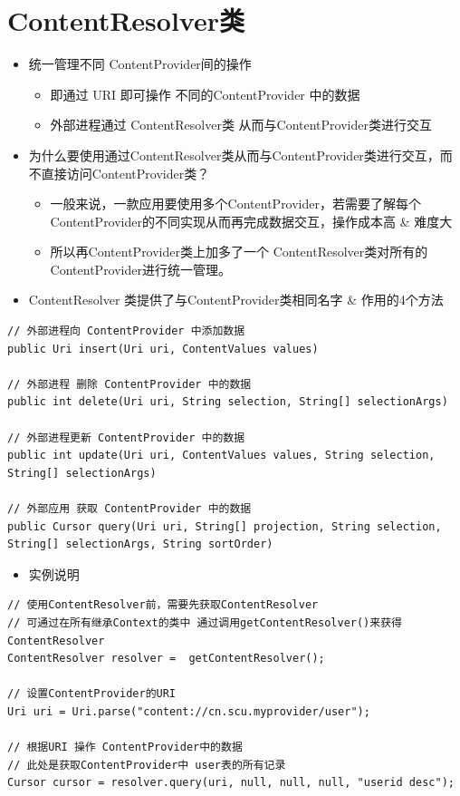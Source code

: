 \documentclass[9pt, b5paaper]{book}
\begin{document}
\section{ContentResolver类}
\label{sec-5-4}
\begin{itemize}
\item 统一管理不同 ContentProvider间的操作
\begin{itemize}
\item 即通过 URI 即可操作 不同的ContentProvider 中的数据
\item 外部进程通过 ContentResolver类 从而与ContentProvider类进行交互
\end{itemize}
\item 为什么要使用通过ContentResolver类从而与ContentProvider类进行交互，而不直接访问ContentProvider类？
\begin{itemize}
\item 一般来说，一款应用要使用多个ContentProvider，若需要了解每个ContentProvider的不同实现从而再完成数据交互，操作成本高 \& 难度大
\item 所以再ContentProvider类上加多了一个 ContentResolver类对所有的ContentProvider进行统一管理。
\end{itemize}
\item ContentResolver 类提供了与ContentProvider类相同名字 \& 作用的4个方法
\end{itemize}
\begin{verbatim}
// 外部进程向 ContentProvider 中添加数据
public Uri insert(Uri uri, ContentValues values)　 

// 外部进程 删除 ContentProvider 中的数据
public int delete(Uri uri, String selection, String[] selectionArgs)

// 外部进程更新 ContentProvider 中的数据
public int update(Uri uri, ContentValues values, String selection, String[] selectionArgs)　 

// 外部应用 获取 ContentProvider 中的数据
public Cursor query(Uri uri, String[] projection, String selection, String[] selectionArgs, String sortOrder)
\end{verbatim}
\begin{itemize}
\item 实例说明
\end{itemize}
\begin{verbatim}
// 使用ContentResolver前，需要先获取ContentResolver
// 可通过在所有继承Context的类中 通过调用getContentResolver()来获得ContentResolver
ContentResolver resolver =  getContentResolver(); 

// 设置ContentProvider的URI
Uri uri = Uri.parse("content://cn.scu.myprovider/user"); 
 
// 根据URI 操作 ContentProvider中的数据
// 此处是获取ContentProvider中 user表的所有记录 
Cursor cursor = resolver.query(uri, null, null, null, "userid desc");
\end{verbatim}
\end{document}
